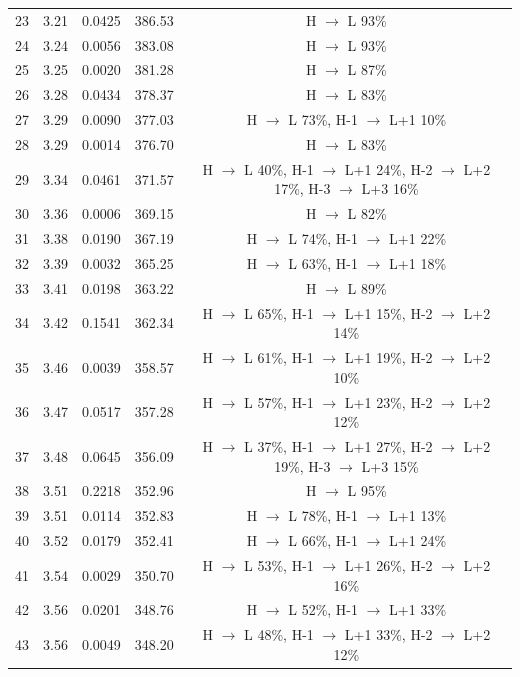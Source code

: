 \begin{table}[H]
{\begin{center}
\begin{tabular}{ccccc}
23 & 3.21 & 0.0425 & 386.53 & H $\rightarrow$ L 93\% \\
24 & 3.24 & 0.0056 & 383.08 & H $\rightarrow$ L 93\% \\
25 & 3.25 & 0.0020 & 381.28 & H $\rightarrow$ L 87\% \\
26 & 3.28 & 0.0434 & 378.37 & H $\rightarrow$ L 83\% \\
27 & 3.29 & 0.0090 & 377.03 & H $\rightarrow$ L 73\%, H-1 $\rightarrow$ L+1 10\% \\
28 & 3.29 & 0.0014 & 376.70 & H $\rightarrow$ L 83\% \\
29 & 3.34 & 0.0461 & 371.57 & H $\rightarrow$ L 40\%, H-1 $\rightarrow$ L+1 24\%, H-2 $\rightarrow$ L+2 17\%, H-3 $\rightarrow$ L+3 16\% \\
30 & 3.36 & 0.0006 & 369.15 & H $\rightarrow$ L 82\% \\
31 & 3.38 & 0.0190 & 367.19 & H $\rightarrow$ L 74\%, H-1 $\rightarrow$ L+1 22\% \\
32 & 3.39 & 0.0032 & 365.25 & H $\rightarrow$ L 63\%, H-1 $\rightarrow$ L+1 18\% \\
33 & 3.41 & 0.0198 & 363.22 & H $\rightarrow$ L 89\% \\
34 & 3.42 & 0.1541 & 362.34 & H $\rightarrow$ L 65\%, H-1 $\rightarrow$ L+1 15\%, H-2 $\rightarrow$ L+2 14\% \\
35 & 3.46 & 0.0039 & 358.57 & H $\rightarrow$ L 61\%, H-1 $\rightarrow$ L+1 19\%, H-2 $\rightarrow$ L+2 10\% \\
36 & 3.47 & 0.0517 & 357.28 & H $\rightarrow$ L 57\%, H-1 $\rightarrow$ L+1 23\%, H-2 $\rightarrow$ L+2 12\% \\
37 & 3.48 & 0.0645 & 356.09 & H $\rightarrow$ L 37\%, H-1 $\rightarrow$ L+1 27\%, H-2 $\rightarrow$ L+2 19\%, H-3 $\rightarrow$ L+3 15\% \\
38 & 3.51 & 0.2218 & 352.96 & H $\rightarrow$ L 95\% \\
39 & 3.51 & 0.0114 & 352.83 & H $\rightarrow$ L 78\%, H-1 $\rightarrow$ L+1 13\% \\
40 & 3.52 & 0.0179 & 352.41 & H $\rightarrow$ L 66\%, H-1 $\rightarrow$ L+1 24\% \\
41 & 3.54 & 0.0029 & 350.70 & H $\rightarrow$ L 53\%, H-1 $\rightarrow$ L+1 26\%, H-2 $\rightarrow$ L+2 16\% \\
42 & 3.56 & 0.0201 & 348.76 & H $\rightarrow$ L 52\%, H-1 $\rightarrow$ L+1 33\% \\
43 & 3.56 & 0.0049 & 348.20 & H $\rightarrow$ L 48\%, H-1 $\rightarrow$ L+1 33\%, H-2 $\rightarrow$ L+2 12\% \\

\end{tabular}
\end{center}}
\end{table}
